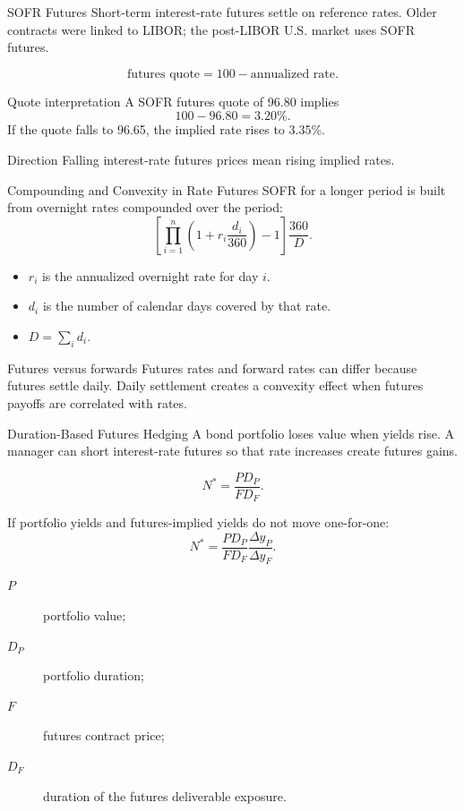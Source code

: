 \documentclass[aspectratio=169,11pt]{beamer}
\begin{document}
\begin{frame}{SOFR Futures}
    Short-term interest-rate futures settle on reference rates.
    Older contracts were linked to LIBOR; the post-LIBOR U.S. market uses SOFR futures.

    \[
        \text{futures quote}=100-\text{annualized rate}.
    \]

    \begin{exampleblock}{Quote interpretation}
        A SOFR futures quote of 96.80 implies
        \[
            100-96.80=3.20\%.
        \]
        If the quote falls to 96.65, the implied rate rises to 3.35\%.
    \end{exampleblock}

    \begin{alertblock}{Direction}
        Falling interest-rate futures prices mean rising implied rates.
    \end{alertblock}
\end{frame}

\begin{frame}{Compounding and Convexity in Rate Futures}
    \small
    SOFR for a longer period is built from overnight rates compounded over the period:
    \[
        \left[\prod_{i=1}^n \left(1+r_i\frac{d_i}{360}\right)-1\right]
        \frac{360}{D}.
    \]

    \begin{itemize}
        \item \(r_i\) is the annualized overnight rate for day \(i\).
        \item \(d_i\) is the number of calendar days covered by that rate.
        \item \(D=\sum_i d_i\).
    \end{itemize}

    \begin{block}{Futures versus forwards}
        Futures rates and forward rates can differ because futures settle daily.
        Daily settlement creates a convexity effect when futures payoffs are correlated with rates.
    \end{block}
\end{frame}

\begin{frame}{Duration-Based Futures Hedging}
    A bond portfolio loses value when yields rise.
    A manager can short interest-rate futures so that rate increases create futures gains.

    \[
        N^*=\frac{P D_P}{F D_F}.
    \]

    If portfolio yields and futures-implied yields do not move one-for-one:
    \[
        N^*=\frac{P D_P}{F D_F}
        \frac{\Delta y_P}{\Delta y_F}.
    \]

    \begin{description}
        \item[\(P\)] portfolio value;
        \item[\(D_P\)] portfolio duration;
        \item[\(F\)] futures contract price;
        \item[\(D_F\)] duration of the futures deliverable exposure.
    \end{description}
\end{frame}
\end{document}
